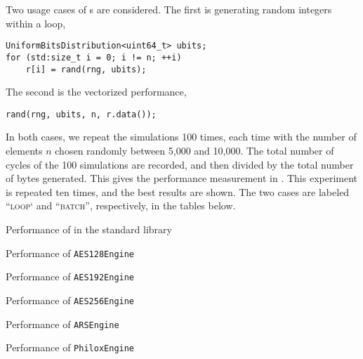 Two usage cases of \rng{}s are considered. The first is generating random
integers within a loop,
\begin{verbatim}
UniformBitsDistribution<uint64_t> ubits;
for (std:size_t i = 0; i != n; ++i)
    r[i] = rand(rng, ubits);
\end{verbatim}
The second is the vectorized performance,
\begin{verbatim}
rand(rng, ubits, n, r.data());
\end{verbatim}
In both cases, we repeat the simulations 100 times, each time with the number
of elements $n$ chosen randomly between 5,000 and 10,000. The total number of
cycles of the 100 simulations are recorded, and then divided by the total
number of bytes generated. This gives the performance measurement in \cpb. This
experiment is repeated ten times, and the best results are shown. The two cases
are labeled ``\textsc{loop}` and ``\textsc{batch}'', respectively, in the
tables below.

\begin{table}
  \caption{Performance of \rng in the standard library}
  \label{tab:Performance of RNG in the standard library RNG}
\end{table}

\begin{table}
  \caption{Performance of \protect\texttt{AES128Engine}}
  \label{tab:Performance of AES128Engine}
\end{table}

\begin{table}
  \caption{Performance of \protect\texttt{AES192Engine}}
  \label{tab:Performance of AES192Engine}
\end{table}

\begin{table}
  \caption{Performance of \protect\texttt{AES256Engine}}
  \label{tab:Performance of AES256Engine}
\end{table}

\begin{table}
  \caption{Performance of \protect\texttt{ARSEngine}}
  \label{tab:Performance of ARSEngine}
\end{table}

\begin{table}
  \caption{Performance of \protect\texttt{PhiloxEngine}}
  \label{tab:Performance of PhiloxEngine}
\end{table}

